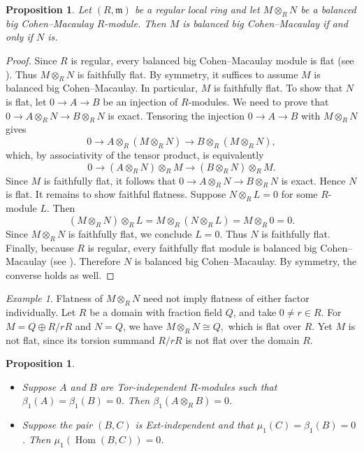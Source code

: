 \documentclass[11pt,a4paper]{amsart}
\numberwithin{equation}{section}
\newtheorem{proposition}[theorem]{Proposition}
\theoremstyle{definition}
\theoremstyle{remark}
\newtheorem{example}[theorem]{Example}
\newcommand{\Hom}{\operatorname{Hom}}
\begin{document}
\begin{proposition}
	Let $(R,\mathfrak{m})$ be a regular local ring and let $M\otimes_R N$ be a balanced big Cohen--Macaulay $R$-module.
	Then $M$ is balanced big Cohen--Macaulay if and only if $N$ is.
\end{proposition}

\begin{proof}
	Since $R$ is regular, every balanced big Cohen--Macaulay module is flat (see \cite[Page 61]{h}). Thus $M\otimes_R N$ is faithfully flat. 
By symmetry, it suffices to assume $M$ is balanced big Cohen--Macaulay. In particular, $M$ is faithfully flat. 
	To show that $N$ is flat, let $0 \to A \to B$ be an injection of $R$-modules. We need to prove that
$
	0 \longrightarrow A\otimes_R N \longrightarrow B\otimes_R N
$
	is exact. Tensoring the injection $0 \to A \to B$ with $M\otimes_R N$ gives
	\[
	0 \longrightarrow A \otimes_R (M\otimes_R N) \longrightarrow B \otimes_R (M\otimes_R N),
	\]
	which, by associativity of the tensor product, is equivalently
	\[
	0 \longrightarrow (A\otimes_R N)\otimes_R M \longrightarrow (B\otimes_R N)\otimes_R M.
	\]
	Since $M$ is faithfully flat, it follows that
$
	0 \longrightarrow A\otimes_R N \longrightarrow B\otimes_R N
$
	is exact. Hence $N$ is flat.
It remains to show faithful flatness. Suppose $N\otimes_R L = 0$ for some $R$-module $L$. Then
\[
	(M\otimes_R N)\otimes_R L = M\otimes_R (N\otimes_R L) = M\otimes_R 0 = 0.
	\]
Since $M\otimes_R N$ is faithfully flat, we conclude $L = 0$. Thus $N$ is faithfully flat.
	Finally, because $R$ is regular, every faithfully flat module is balanced big Cohen--Macaulay (see \cite[Page 61]{h}). Therefore $N$ is balanced big Cohen--Macaulay. By symmetry, the converse holds as well.
\end{proof}

\begin{example}
	Flatness of \(M\otimes_R N\) need not imply flatness of either factor individually. Let \(R\) be a domain with fraction field \(Q\), and take \(0 \neq r \in R\). For \(M = Q \oplus R/rR\) and \(N = Q\), we have
	\(
	M \otimes_R N \cong Q,
	\)
	which is flat over \(R\). Yet \(M\) is not flat, since its torsion summand \(R/rR\) is not flat over the domain \(R\).
\end{example}
\begin{proposition} 	\begin{itemize}
		\item[(i)]
	Suppose \(A\) and \(B\) are Tor-independent \(R\)-modules such that \(\beta_1(A)=\beta_1(B)=0\). Then \(\beta_1(A\otimes_R B)=0\).
	
	\item[(ii)]	
	Suppose the pair \((B,C)\) is Ext-independent and that \(\mu_1(C)=\beta_1(B)=0\). Then \(\mu_1(\Hom( B,C))=0\).
\end{itemize}\end{proposition}
\end{document}
